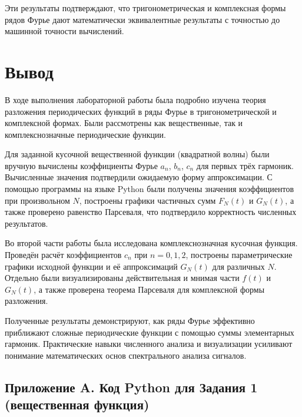 Эти результаты подтверждают, что тригонометрическая и комплексная формы рядов Фурье дают математически эквивалентные результаты с точностью до машинной точности вычислений.

\newpage 
\section*{Вывод}

В ходе выполнения лабораторной работы была подробно изучена теория разложения периодических функций в ряды Фурье в тригонометрической и комплексной формах. Были рассмотрены как вещественные, так и комплекснозначные периодические функции.

Для заданной кусочной вещественной функции (квадратной волны) были вручную вычислены коэффициенты Фурье $a_n$, $b_n$, $c_n$ для первых трёх гармоник. Вычисленные значения подтвердили ожидаемую форму аппроксимации. С помощью программы на языке Python были получены значения коэффициентов при произвольном $N$, построены графики частичных сумм $F_N(t)$ и $G_N(t)$, а также проверено равенство Парсеваля, что подтвердило корректность численных результатов.

Во второй части работы была исследована комплекснозначная кусочная функция. Проведён расчёт коэффициентов $c_n$ при $n = 0, 1, 2$, построены параметрические графики исходной функции и её аппроксимаций $G_N(t)$ для различных $N$. Отдельно были визуализированы действительная и мнимая части $f(t)$ и $G_N(t)$, а также проверена теорема Парсеваля для комплексной формы разложения.

Полученные результаты демонстрируют, как ряды Фурье эффективно приближают сложные периодические функции с помощью суммы элементарных гармоник. Практические навыки численного анализа и визуализации усиливают понимание математических основ спектрального анализа сигналов.


\subsection*{Приложение A. Код Python для Задания 1 (вещественная функция)}

